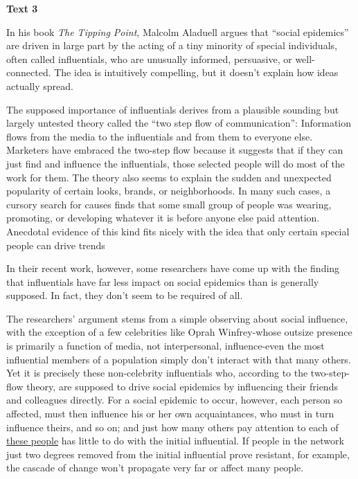 
\begin{center}\textbf{Text 3}\end{center}

\qquad In his book \emph{The Tipping Point}, Malcolm Aladuell argues that ``social epidemics'' are driven in large part by the acting of a tiny minority of special individuals, often called influentials, who are unusually informed, persuasive, or well-connected. The idea is intuitively compelling, but it doesn't explain how ideas actually spread.

\qquad The supposed importance of influentials derives from a plausible sounding but largely untested theory called the ``two step flow of communication'': Information flows from the media to the influentials and from them to everyone else. Marketers have embraced the two-step flow because it suggests that if they can just find and influence the influentials, those selected people will do most of the work for them. The theory also seems to explain the sudden and unexpected popularity of certain looks, brands, or neighborhoods. In many such cases, a cursory search for causes finds that some small group of people was wearing, promoting, or developing whatever it is before anyone else paid attention. Anecdotal evidence of this kind fits nicely with the idea that only certain special people can drive trends

\qquad In their recent work, however, some researchers have come up with the finding that influentials have far less impact on social epidemics than is generally supposed. In fact, they don't seem to be required of all.

\qquad The researchers' argument stems from a simple observing about social influence, with the exception of a few celebrities like Oprah Winfrey-whose outsize presence is primarily a function of media, not interpersonal, influence-even the most influential members of a population simply don't interact with that many others. Yet it is precisely these non-celebrity influentials who, according to the two-step-flow theory, are supposed to drive social epidemics by influencing their friends and colleagues directly. For a social epidemic to occur, however, each person so affected, must then influence his or her own acquaintances, who must in turn influence theirs, and so on; and just how many others pay attention to each of \ul{these people} has little to do with the initial influential. If people in the network just two degrees removed from the initial influential prove resistant, for example, the cascade of change won't propagate very far or affect many people.

